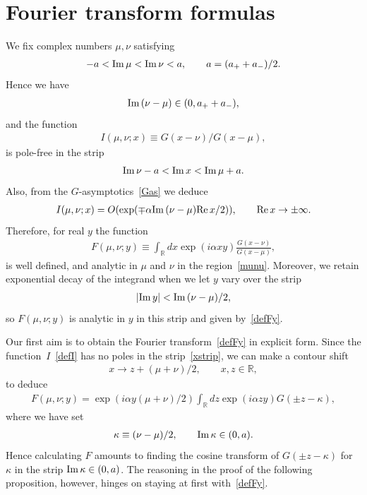 \documentclass[11pt]{article}
\numberwithin{equation}{section}
\newcommand{\R}{{\mathbb R}}
\newcommand{\re}{{\rm Re}\, }
\newcommand{\im}{{\rm Im}\, }
\begin{document}
\section{Fourier transform formulas}\label{appendixC}

We f\/ix complex numbers $\mu,\nu$ satisfying
\begin{gather}\label{munu}
-a<\im \mu<\im \nu <a,\qquad a=(a_{+}+a_{-})/2.
\end{gather}
Hence we have
\begin{gather}
\im (\nu-\mu)\in(0,a_{+}+a_{-}),
\end{gather}
and the function
\begin{gather}\label{defI}
I(\mu,\nu;x)\equiv G(x-\nu)/G(x-\mu),
\end{gather}
is pole-free in the strip
\begin{gather}\label{xstrip}
\im \nu -a<\im x<\im \mu +a.
\end{gather}
Also, from the $G$-asymptotics~\eqref{Gas} we deduce
\begin{gather}
I(\mu,\nu;x)=O(\exp(\mp \alpha\im (\nu -\mu)\re x/2)),\qquad \re x\to\pm\infty.
\end{gather}
Therefore, for real $y$ the function
\begin{gather}\label{defFy}
F(\mu,\nu;y)\equiv \int_{\R}dx \exp(i\alpha xy)\frac{G(x-\nu)}{G(x-\mu)},
\end{gather}
is well def\/ined, and analytic in $\mu$ and $\nu$ in the region~\eqref{munu}. Moreover, we retain exponential decay of the integrand when we let $y$ vary over the strip
\begin{gather}\label{ystrip}
|\im y|<\im(\nu-\mu)/2,
\end{gather}
so $F(\mu,\nu;y)$ is analytic in $y$ in this strip and given by~\eqref{defFy}.

Our f\/irst aim is to obtain the Fourier transform~\eqref{defFy} in explicit form. Since the func\-tion~$I$~\eqref{defI} has no poles in the strip~\eqref{xstrip}, we can make a contour shift
\begin{gather}
x \to z +(\mu+\nu)/2,\qquad x,z\in\R,
\end{gather}
to deduce
\begin{gather}\label{Fkap}
F(\mu,\nu;y)=\exp(i\alpha y(\mu+\nu)/2)\int_{\R}dz \exp(i\alpha zy)G(\pm z-\kappa),
\end{gather}
where we have set
\begin{gather}\label{kappa}
\kappa \equiv (\nu-\mu)/2,\qquad \im \kappa \in(0,a).
\end{gather}
Hence calculating $F$ amounts to f\/inding the cosine transform of $G(\pm z-\kappa)$ for $\kappa$ in the strip $\im \kappa\in(0,a)$. The reasoning in the proof of the following proposition, however, hinges on staying at f\/irst with~\eqref{defFy}.
\end{document}
